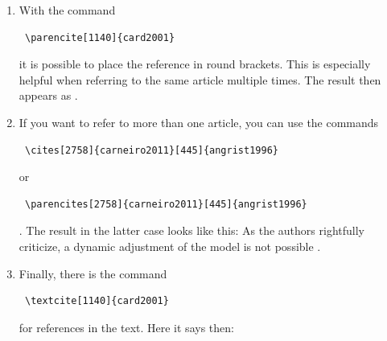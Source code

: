 \begin{enumerate}
\item With the command \begin{verbatim} \parencite[1140]{card2001} \end{verbatim} it is possible to place the reference in round brackets. This is especially helpful when referring to the same article multiple times. The result then appears as \parencite [see][1140]{card2001}.\\

\item If you want to refer to more than one article, you can use the commands \begin{verbatim} \cites[2758]{carneiro2011}[445]{angrist1996} \end{verbatim}  or \begin{verbatim} \parencites[2758]{carneiro2011}[445]{angrist1996} \end{verbatim} . The result in the latter case looks like this: As the authors rightfully criticize, a dynamic adjustment of the model is not possible \parencites [2758]{carneiro2011}[445]{angrist1996}. 

\item Finally, there is the command \begin{verbatim} \textcite[1140]{card2001} \end{verbatim} for references in the text. Here it says then: \textcite[1140]{card2001}
\end{enumerate}
